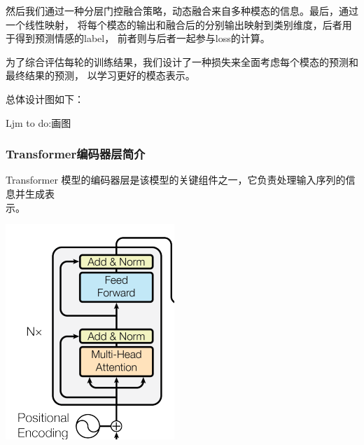 \documentclass[11pt]{article}
\begin{document}
            然后我们通过一种分层门控融合策略，动态融合来自多种模态的信息。最后，通过一个线性映射，
            将每个模态的输出和融合后的分别输出映射到类别维度，后者用于得到预测情感的label，
            前者则与后者一起参与loss的计算。
            
            为了综合评估每轮的训练结果，我们设计了一种损失来全面考虑每个模态的预测和最终结果的预测，
            以学习更好的模态表示。
            
            总体设计图如下：
            
            Ljm to do:画图
            
            \subsubsection{Transformer编码器层简介}
            Transformer 模型的编码器层是该模型的关键组件之一，它负责处理输入序列的信息并生成表\\示。

            \begin{center}
                \includegraphics[scale=0.9]{graph/transformer1.png}
            \end{center}
\end{document}
